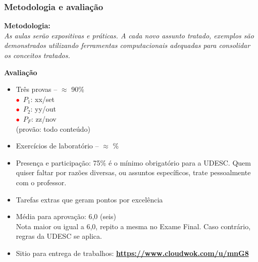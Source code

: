 \begin{frame}[allowframebreaks=0.9]

\frametitle{Metodologia e avaliação}

\textbf{Metodologia:} \\

\textit{As aulas serão expositivas e práticas. A cada novo assunto tratado, exemplos  são demonstrados utilizando ferramentas computacionais adequadas para consolidar os conceitos 
 tratados. 
 }


\newpage
    \textbf{Avaliação}

    \begin{itemize}
    \item Três provas -- $\approx$  90\%\\
      
	\quad \textcolor{red}{$\bullet$}~$P_1$: xx/set\\
	\quad \textcolor{red}{$\bullet$}~$P_2$: yy/out\\
	\quad \textcolor{red}{$\bullet$}~$P_F$: zz/nov\\(provão: todo conteúdo)

      \item Exercícios de laboratório  -- $\approx$ \%
       
      \item Presença e participação: 75\% é o mínimo obrigatório
      para a UDESC. Quem quiser faltar por razões diversas,
       ou assuntos específicos, trate pessoalmente com o professor.
        
      \item Tarefas extras que geram pontos por excelência 
      
      \item Média para aprovação: 6,0 (seis)\\
      Nota maior ou igual a 6,0, repito a mesma no Exame Final. Caso contrário, regras da UDESC se aplica.
      
      \item Sitio para entrega de trabalhos: \textbf{\url{https://www.cloudwok.com/u/mnG8}}
    \end{itemize}

\end{frame}



